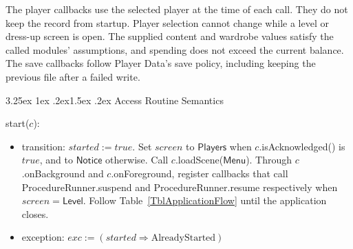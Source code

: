 \documentclass[10pt, titlepage]{article}
\makeatletter
\renewcommand\paragraph{\@startsection{paragraph}{4}{\z@}%
  {3.25ex \@plus 1ex \@minus .2ex}{1.5ex \@plus .2ex}%
  {\normalfont\normalsize\bfseries}}
\newcommand{\T}[1]{\mathit{#1}}          %
\newcommand{\V}[1]{\mathsf{#1}}          %
\newcommand{\exc}{\mathit{exc}}
\newcommand{\true}{\mathit{true}}
\makeatother
\begin{document}
The player callbacks use the selected player at the time of each call.
They do not keep the record from startup. Player selection cannot change
while a level or dress-up screen is open. The supplied content and wardrobe
values satisfy the called modules' assumptions, and spending does not
exceed the current balance. The save callbacks follow Player Data's save
policy, including keeping the previous file after a failed write.

\paragraph{Access Routine Semantics}

\begin{samepage}
\noindent start($c$):
\begin{itemize}
\item transition: $\T{started} := \true$. Set $\T{screen}$ to
  $\V{Players}$ when $c$.isAcknowledged() is $\true$, and to
  $\V{Notice}$ otherwise. Call $c$.loadScene($\V{Menu}$).
  Through $c$.onBackground and
  $c$.onForeground, register callbacks that call ProcedureRunner.suspend
  and ProcedureRunner.resume respectively when $\T{screen} = \V{Level}$.
  Follow Table~\ref{TblApplicationFlow} until the application closes.
\item exception: $\exc := (\T{started} \Rightarrow \text{AlreadyStarted})$
\end{itemize}
\end{samepage}
\par\pagebreak[0]
\end{document}
